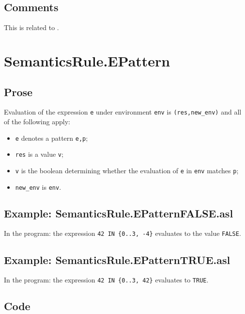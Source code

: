 \documentclass{book}
\begin{document}
\subsection{Comments}
  This is related to .

\section{SemanticsRule.EPattern \label{sec:SemanticsRule.EPattern}}


  \subsection{Prose}
  Evaluation of the expression \texttt{e} under environment \texttt{env} is
  \texttt{(res,new\_env)} and all of the following apply:
  \begin{itemize}
  \item \texttt{e} denotes a pattern \texttt{e,p};
  \item \texttt{res} is a value \texttt{v};
  \item \texttt{v} is the boolean determining whether the evaluation of \texttt{e} in \texttt{env} matches \texttt{p};
  \item \texttt{new\_env} is \texttt{env}.
  \end{itemize}

  \subsection{Example: SemanticsRule.EPatternFALSE.asl}
    In the program:
    the expression \texttt{42 IN \{0..3, -4\}} evaluates to the value \texttt{FALSE}.

  \subsection{Example: SemanticsRule.EPatternTRUE.asl}
    In the program:
    the expression \texttt{42 IN \{0..3, 42\}} evaluates to \texttt{TRUE}.

  \subsection{Code}
\end{document}
